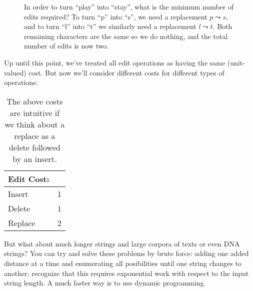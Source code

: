 \documentclass[12pt]{article}
\begin{document}
\begin{figure}[h]
  \begin{center}
  \end{center}
  \caption{In order to turn ``play'' into ``stay'', what is the minimum number of edits required? To turn ``p'' into ``s'', we need a replacement $p \leadsto s$, and to turn ``l'' into ``t'' we similarly need a replacement $l \leadsto t$. Both remaining characters are the same so we do nothing, and the total number of edits is now two.}
\end{figure}

Up until this point, we've treated all edit operations as having the same (unit-valued) cost. But now we'll consider different costs for different types of operations:

\begin{table}[h]
  \begin{center}
    \begin{tabular}{l c}
      Edit Cost: & \\
      \hline
      Insert & 1 \\
      Delete & 1 \\
      Replace & 2
    \end{tabular}
  \end{center}
  \caption{The above costs are intuitive if we think about a replace as a delete followed by an insert.}
\end{table}

But what about much longer strings and large corpora of texts or even DNA strings? You can try and solve these problems by brute force: adding one added distance at a time and enumerating all posibilities until one string changes to another; recognize that this requires exponential work with respect to the input string length. A much faster way is to use dynamic programming.
\end{document}
